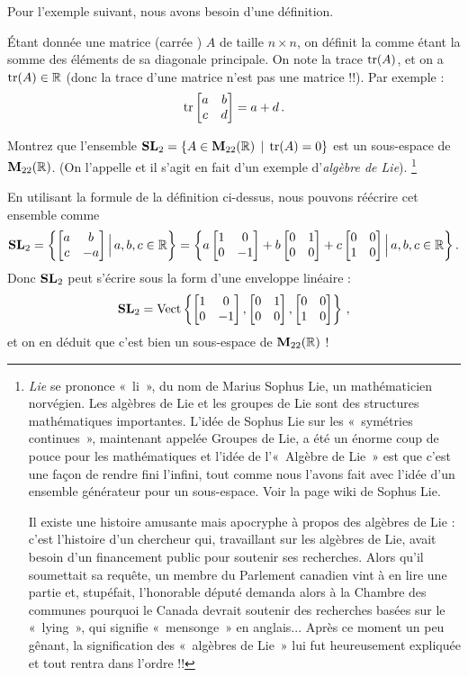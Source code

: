 Pour l'exemple suivant, nous avons besoin d'une définition.


\begin{definition}
Étant donnée une matrice (\og carrée \fg) $A$ de taille $n \times n$, on définit la 
comme étant la somme des éléments de sa diagonale principale. On note la trace $\tr(A)$, et on a $\tr(A) \in \R$ (donc la trace d'une matrice n'est pas une matrice !!).
Par exemple :
$$
\tr\mat{a & b\\ c& d} = a + d\,.
$$
\end{definition}

\begin{myprob} Montrez que l'ensemble $\sl_2 = \{ A \in \M_{22}(\R) \st \tr(A) = 0\}$
est un sous-espace de $\M_{22}(\R)$. (On l'appelle  et il s'agit en fait d'un exemple d'\emph{algèbre de Lie}). \footnote{\emph{Lie} se prononce «~li~», du nom de Marius Sophus Lie, un mathématicien norvégien. Les algèbres de Lie et les groupes de Lie sont des structures mathématiques importantes. L'idée de Sophus Lie sur les «~symétries continues~», maintenant appelée Groupes de Lie, a été un énorme coup de pouce pour les mathématiques et l'idée de l'«~Algèbre de Lie~» est que c'est une façon de rendre fini l'infini, tout comme nous l'avons fait avec l'idée d'un ensemble générateur pour un sous-espace. Voir la page wiki de Sophus Lie.


Il existe une histoire amusante mais apocryphe à propos des algèbres de Lie : c'est l'histoire d'un chercheur qui, travaillant sur les algèbres de Lie, avait besoin d'un financement public pour soutenir ses recherches. Alors qu'il soumettait sa requête, un membre du Parlement canadien vint à en lire une partie et, stupéfait, l'honorable député demanda alors à la Chambre des communes pourquoi le Canada devrait soutenir des recherches basées sur le «~lying~», qui signifie «~mensonge~» en anglais... Après ce moment un peu gênant, la signification des «~algèbres de Lie~» lui fut heureusement expliquée et tout rentra dans l'ordre !\!! }

\begin{mysol} En utilisant la formule de la définition ci-dessus, nous pouvons réécrire cet
ensemble comme
$$
\sl_2 = \left\{ \mat{a & b \\c & -a} \Big| \,a,b,c\in \R\right\}
= \left\{ a\mat{1&0\\0&-1}+ b \mat{0&1\\ 0&0}+ c\mat{0&0\\1&0} \Big| \,a,b,c\in \R\right\}.
$$
Donc $\sl_2$ peut s'écrire sous la form d'une enveloppe linéaire :
$$
\sl_2 = \spn\left\{ \mat{1&0\\0&-1}, \mat{0&1\\ 0&0}, \mat{0&0\\1&0}\right\}\,,
$$
et on en déduit que c'est bien un sous-espace de $\M_{22}(\R)$ !
\end{mysol}\end{myprob}


